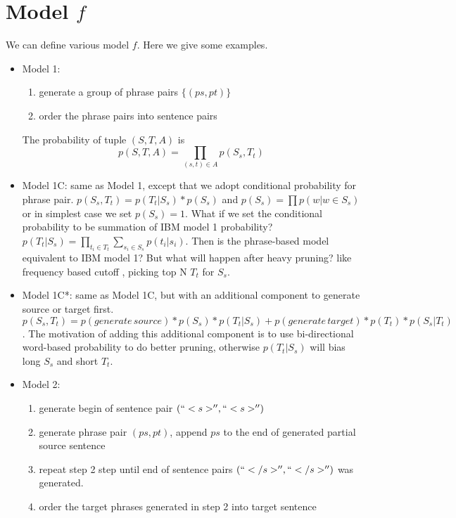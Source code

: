 \documentclass[11pt, letterpaper]{article}   	%
\begin{document}
\section{Model $f$} 
We can define various model $f$. Here we give some examples.
\begin{itemize}

\item Model 1:
\begin{enumerate}
\item generate a group of phrase pairs $\{(ps,pt)\}$
\item order the phrase pairs into sentence pairs
\end{enumerate}

The probability of tuple $(S,T,A)$ is 
\begin{equation} \label{eq:obj1}
p(S,T,A)=\prod_{(s,t)\in A}p(S_s,T_t)
\end{equation}

\item Model 1C:
same as Model 1, except that we adopt conditional probability for phrase pair. $p(S_s,T_t)=p(T_t|S_s)*p(S_s)$ and $p(S_s)=\prod p(w|w\in S_s)$ or in simplest case we set $p(S_s)=1$. What if we set the conditional probability to be summation of IBM model 1 probability? $p(T_t|S_s)=\prod_{t_i \in T_t} \sum_{s_i\in S_s} p(t_i|s_i)$. Then is the phrase-based model equivalent to IBM model 1? But what will happen after heavy pruning? like frequency based cutoff \cite{marcu-wong-02}, picking top N $T_t$ for $S_s$.

\item Model 1C*:
same as Model 1C, but with an additional component to generate source or target first. 
\begin{equation}
p(S_s,T_t)=p(generate\,source)*p(S_s)*p(T_t|S_s)+p(generate\,target)*p(T_t)*p(S_s|T_t)
\end{equation}. The motivation of adding this additional component is to use bi-directional word-based probability to do better pruning, otherwise $p(T_t|S_s)$ will bias long $S_s$ and short $T_t$.

\item Model 2:

\begin{enumerate}
\item generate begin of sentence pair $(``<s>'',``<s>'')$
\item generate phrase pair $(ps,pt)$, append $ps$ to the end of generated partial source sentence
\item repeat step 2 step until end of sentence pairs $(``</s>'',``</s>'')$ was generated.
\item order the target phrases generated in step 2 into target sentence
\end{enumerate}


\end{itemize}
\end{document}
